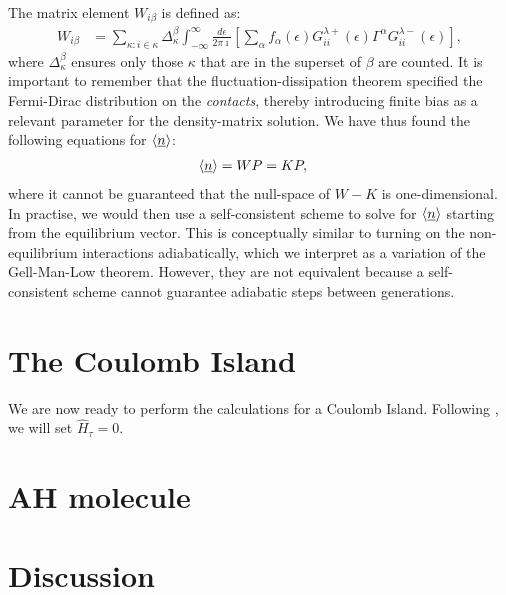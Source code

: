 \documentclass{article}
\begin{document}
\begin{multicols}{2}
        The matrix element $W_{i\beta}$ is defined as:
        \begin{align*}
        W_{i\beta} &= \sum_{\kappa: i \in \kappa} \Delta^\beta_\kappa \int^\infty_{-\infty} \frac{d\epsilon}{2\pi\imath} \left[ \sum_\alpha f_\alpha(\epsilon) G^{\lambda+}_{ii} (\epsilon) \Gamma^\alpha G^{\lambda-}_{ii} (\epsilon)\right],
        \end{align*} where $\Delta^\beta_\kappa$ ensures only those $\kappa$ that are in the superset of $\beta$ are counted. It is important to remember that the fluctuation-dissipation theorem specified the Fermi-Dirac distribution on the \emph{contacts}, thereby introducing finite bias as a relevant parameter for the density-matrix solution. We have thus found the following equations for $\braket{\underline{n}}$:
        \begin{align}
            \braket{\underline{n}} &= WP = KP\label{eq:selfconsistent},
        \end{align}
        where it cannot be guaranteed that the null-space of $W-K$ is one-dimensional. In practise, we would then use a self-consistent scheme to solve for $\braket{\underline{n}}$ starting from the equilibrium vector. This is conceptually similar to turning on the non-equilibrium interactions adiabatically, which we interpret as a variation of the Gell-Man-Low theorem\cite{gellmannlow, molinari}. However, they are not equivalent because a self-consistent scheme cannot guarantee adiabatic steps between generations.

    \section{The Coulomb Island}\label{sec:island}
        We are now ready to perform the calculations for a Coulomb Island. Following \citet{haugjauho}, we will set $\hat{H}_\tau = 0$. 
    \section{AH molecule}\label{sec:ahmolecule}
    \section{Discussion}\label{sec:discussion}
     
\end{multicols}
\end{document}
